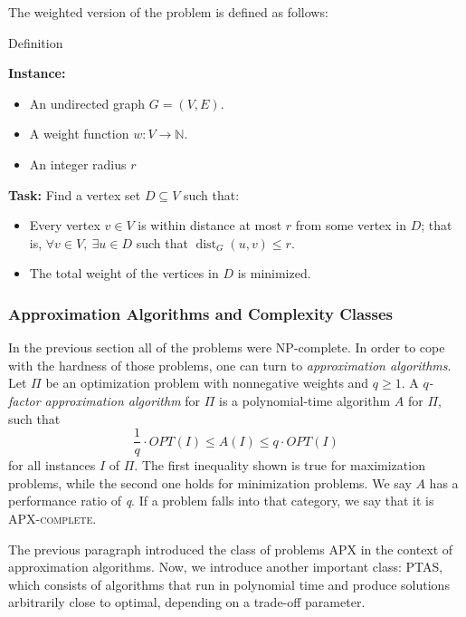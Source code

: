 The weighted version of the problem is defined as follows:

\begin{mydefinition}{Definition}
    \label{def:weighted-r-DS}

    \textbf{Instance:}
    \begin{itemize}[noitemsep, topsep=0pt]
        \item An undirected graph \( G = (V, E) \).
        \item A weight function \( w: V \rightarrow \mathbb{N} \).
        \item An integer radius \( r \)
    \end{itemize}

    \textbf{Task:}
    Find a vertex set \( D \subseteq V \) such that:
    \begin{itemize}[noitemsep, topsep=0pt]
        \item Every vertex \( v \in V \) is within distance at most \( r \) from some vertex in \( D \); that is, \( \forall v \in V,\ \exists u \in D \) such that \( \operatorname{dist}_G(u, v) \leq r \).
        \item The total weight of the vertices in \( D \) is minimized.
    \end{itemize}

\end{mydefinition}


\subsubsection{Approximation Algorithms and Complexity Classes}

In the previous section all of the problems were NP-complete. In order to cope with the hardness 
of those problems, one can turn to \textit{approximation algorithms}.
Let $\Pi$ be an optimization problem with nonnegative weights 
and $q \geq 1$.
A \textit{$q$-factor approximation algorithm} for $\Pi$ is a polynomial-time algorithm $A$ for $\Pi$, 
such that \[\frac{1}{q} \cdot OPT(I) \leq A(I) \leq q \cdot OPT(I)\] for all instances $I$ of $\Pi$.
The first inequality shown is true for maximization problems, while the second one holds for minimization problems.
We say $A$ has a performance ratio of \textit{q}. If a problem falls into that category, we say that it is \textsc{APX-complete}. 

The previous paragraph introduced the class of problems \textsc{APX} in the context
of approximation algorithms. Now, we introduce another important class: \textsc{PTAS},
which consists of algorithms that run in polynomial time and produce solutions arbitrarily close to optimal, depending on a trade-off parameter.

